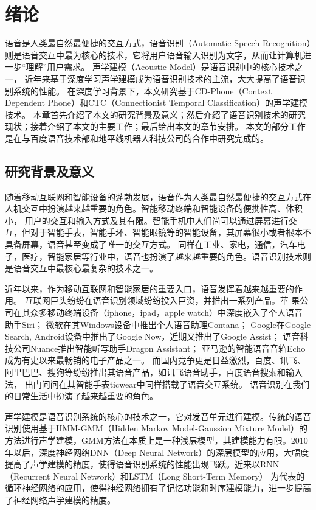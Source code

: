 \chapter{绪论}

语音是人类最自然最便捷的交互方式，语音识别（Automatic Speech Recognition）则是语音交互中最为核心的技术，它将用户语音输入识别为文字，从而让计算机进一步“理解”用户需求。
声学建模（Acoustic Model）是语音识别中的核心技术之一，
近年来基于深度学习声学建模成为语音识别技术的主流，大大提高了语音识别系统的性能。
在深度学习背景下，本文研究基于CD-Phone（Context Dependent Phone）和CTC（Connectionist  Temporal Classification）的声学建模技术。
本章首先介绍了本文的研究背景及意义；然后介绍了语音识别技术的研究现状；接着介绍了本文的主要工作；最后给出本文的章节安排。
本文的部分工作是在与百度语音技术部和地平线机器人科技公司的合作中研究完成的。

\section{研究背景及意义}

随着移动互联网和智能设备的蓬勃发展，语音作为人类最自然最便捷的交互方式在人机交互中扮演越来越重要的角色。智能移动终端和智能设备的便携性高、体积小，
用户的交互和输入方式及其有限。智能手机中人们尚可以通过屏幕进行交互，但对于智能手表，智能手环、智能眼镜等的智能设备，其屏幕很小或者根本不具备屏幕，语音甚至变成了唯一的交互方式。
同样在工业、家电，通信，汽车电子，医疗，智能家居等行业中，语音也扮演了越来越重要的角色。语音识别技术则是语音交互中最核心最复杂的技术之一。

近年以来，作为移动互联网和智能家居的重要入口，语音发挥着越来越重要的作用。
互联网巨头纷纷在语音识别领域纷纷投入巨资，并推出一系列产品。苹
果公司在其众多移动终端设备（iphone，ipad，apple watch）中深度嵌入了个人语音助手Siri；
微软在其Windows设备中推出个人语音助理Contana；
Google在Google Search, Android设备中推出了Google Now，近期又推出了Google Assist；
语音科技公司Nuance推出智能听写助手Dragon Assistant；
亚马逊的智能语音音箱Echo成为有史以来最畅销的电子产品之一。
而国内竞争更是日益激烈，百度、讯飞、阿里巴巴、搜狗等纷纷推出其语音产品，如讯飞语音助手，百度语音搜索和输入法，
出门问问在其智能手表ticwear中同样搭载了语音交互系统。
语音识别在我们的日常生活中扮演了越来越重要的角色。

声学建模是语音识别系统的核心的技术之一，它对发音单元进行建模。传统的语音识别使用基于HMM-GMM（Hidden Markov Model-Gaussion Mixture Model）的方法进行声学建模，GMM方法在本质上是一种浅层模型，其建模能力有限。2010年以后，深度神经网络DNN（Deep Neural Network）的深层模型的应用，大幅度提高了声学建模的精度，使得语音识别系统的性能出现飞跃。近来以RNN（Recurrent Neural Network）和LSTM（Long Short-Term Memory）
为代表的循环神经网络的应用，使得神经网络拥有了记忆功能和时序建模能力，进一步提高了神经网络声学建模的精度。

